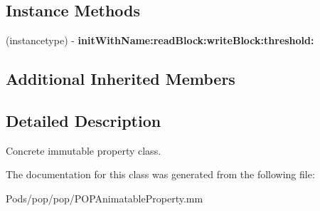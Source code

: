 \subsection*{Instance Methods}
\begin{DoxyCompactItemize}
\item 
\mbox{\label{interface_p_o_p_concrete_animatable_property_a7ec3f93bee879a4f970d83627b05397b}} 
(instancetype) -\/ {\bfseries init\+With\+Name\+:read\+Block\+:write\+Block\+:threshold\+:}
\end{DoxyCompactItemize}
\subsection*{Additional Inherited Members}


\subsection{Detailed Description}
Concrete immutable property class. 

The documentation for this class was generated from the following file\+:\begin{DoxyCompactItemize}
\item 
Pods/pop/pop/P\+O\+P\+Animatable\+Property.\+mm\end{DoxyCompactItemize}
